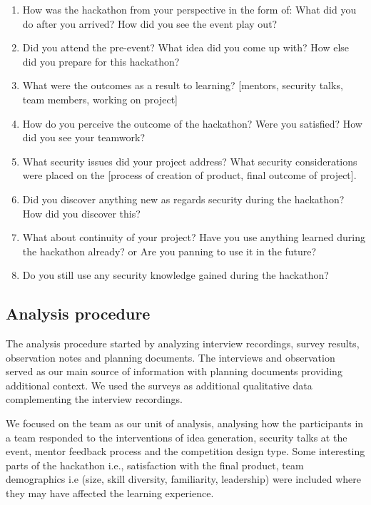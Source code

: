 \documentclass[runningheads]{llncs}
\begin{document}
\begin{enumerate}
    \item How was the hackathon from your perspective in the form of: What did you do after you arrived? How did you see the event play out? 
    \item Did you attend the pre-event? What idea did you come up with? How else did you prepare for this hackathon?
    \item What were the outcomes as a result to learning? [mentors, security talks, team members, working on project]
    \item How do you perceive the outcome of the hackathon? Were you satisfied? How did you see your teamwork? 
    \item What security issues did your project address? What security considerations were placed on the [process of creation of product, final outcome of project].
    \item Did you discover anything new as regards security during the hackathon? How did you discover this?
    \item What about continuity of your project? Have you use anything learned during the hackathon already? or Are you panning to use it in the future? 
    \item Do you still use any security knowledge gained during the hackathon?
\end{enumerate}

\subsection{Analysis procedure}
The analysis procedure started by analyzing interview recordings, survey results, observation notes and planning documents. The interviews and observation served as our main source of information with planning documents providing additional context. We used the surveys as additional qualitative data complementing the interview recordings.

We focused on the team as our unit of analysis, analysing how the participants in a team responded to the interventions of idea generation, security talks at the event, mentor feedback process and the competition design type. Some interesting parts of the hackathon i.e., satisfaction with the final product, team demographics i.e (size, skill diversity, familiarity, leadership) were included where they may have affected the learning experience.
\end{document}
